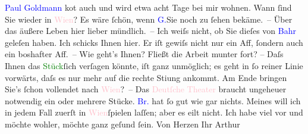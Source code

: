                         \textcolor{blue}{Paul Goldmann}{}\ledrightnote{\textcolor{blue}{Paul Goldmann}} ko{\geminationm}t auch und wird etwa acht {\pb}Tage bei mir wohnen. Wann ſind Sie wieder in \textcolor{pink}{Wien}{}\ledrightnote{\textcolor{pink}{Wien}}? Es wäre ſchön, wenn \textcolor{blue}{G.}{}\ledrightnote{\textcolor{blue}{Paul Goldmann}}{ }Sie noch zu ſehen bekäme. –\pend
           \pstart
           Über das äußere Leben hier lieber mündlich. –\pend
           \pstart
           Ich weiſs nicht, ob Sie dieſes \label{K_L00990_1v}\label{K_L00990_1h} von \textcolor{blue}{Bahr}{}\ledrightnote{\textcolor{blue}{Hermann Bahr}}
                    geleſen haben. Ich schicks Ihnen hier. \label{LL439-1v}Er
                        iſt gewiſs nicht nur ein Aff, ſondern auch ein boshafter Aff. –\label{LL439-1h}\pend
           \pstart
           Wie geht’s Ihnen? Fließt die Arbeit {\pb}munter fort? –
                    Daſs Ihnen das \textcolor{green}{Stück}{}ſich
                    verſagen könnte, iſt ganz unmöglich; es geht in ſo reiner Linie vorwärts, daſs
                    es nur mehr auf die rechte Sti{\geminationm}ung ankommt. Am Ende
                    bringen Sie’s ſchon vollendet nach \textcolor{pink}{Wien}{}\ledrightnote{\textcolor{pink}{Wien}}? –\pend
           \pstart
           Das \textcolor{pink}{Deutſche Theater}{}\ledrightnote{\textcolor{pink}{Deutsches Theater Berlin}} braucht ungeheuer notwendig
                    ein oder mehrere Stücke. \textcolor{blue}{Br.}{}\ledrightnote{\textcolor{blue}{Otto Brahm}} hat ſo gut wie
                    gar nichts. Meines will ich in jedem Fall zuerſt in \textcolor{pink}{Wien}{}\ledrightnote{\textcolor{pink}{Wien}}{ }ſpielen laſſen; aber es eilt nicht. Ich habe viel vor und möchte
                    wohler, möchte ganz geſund ſein.\pend
           \pstart Von Herzen Ihr \spacefill\mbox{Arthur}\pend{}\endnumbering{}  
      